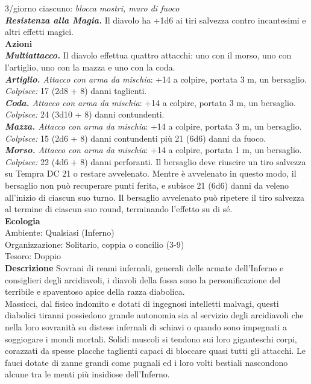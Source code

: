 \begin{multicols}{2}
3/giorno ciascuno: \emph{blocca mostri, muro di fuoco}\\
\emph{\textbf{Resistenza alla Magia.}} Il diavolo ha +1d6 ai tiri salvezza contro incantesimi e altri effetti magici.\\
\smallskip\textbf{Azioni}\\
\emph{\textbf{Multiattacco.}} Il diavolo effettua quattro attacchi: uno con il morso, uno con l'artiglio, uno con la mazza e uno con la coda.\\
\emph{\textbf{Artiglio.} Attacco con arma da mischia}: +14 a colpire, portata 3 m, un bersaglio.\\
\emph{Colpisce:} 17 (2d8 + 8) danni taglienti.\\
\emph{\textbf{Coda.} Attacco con arma da mischia}: +14 a colpire, portata 3 m, un bersaglio.\\
\emph{Colpisce:} 24 (3d10 + 8) danni contundenti.\\
\emph{\textbf{Mazza.} Attacco con arma da mischia}: +14 a colpire, portata 3 m, un bersaglio.\\
\emph{Colpisce:} 15 (2d6 + 8) danni contundenti più 21 (6d6) danni da fuoco.\\
\emph{\textbf{Morso.} Attacco con arma da mischia}: +14 a colpire, portata 1 m, un bersaglio.\\
\emph{Colpisce:} 22 (4d6 + 8) danni perforanti. Il bersaglio deve riuscire un tiro salvezza su Tempra DC 21 o restare avvelenato. Mentre è avvelenato in questo modo, il bersaglio non può recuperare punti ferita, e subisce 21 (6d6) danni da veleno all'inizio di ciascun suo turno. Il bersaglio avvelenato può ripetere il tiro salvezza al termine di ciascun suo round, terminando l'effetto su di sé. \\
\textbf{Ecologia}\\
Ambiente: Qualsiasi (Inferno)\\
Organizzazione: Solitario, coppia o concilio (3-9)\\
Tesoro: Doppio\\
\textbf{Descrizione}
Sovrani di reami infernali, generali delle armate dell’Inferno e consiglieri degli arcidiavoli, i diavoli della fossa sono la personificazione del terribile e spaventoso apice della razza diabolica.\\
Massicci, dal fisico indomito e dotati di ingegnosi intelletti malvagi, questi diabolici tiranni possiedono grande autonomia sia al servizio degli arcidiavoli che nella loro sovranità su distese infernali di schiavi o quando sono impegnati a soggiogare i mondi mortali. Solidi muscoli si tendono sui loro giganteschi corpi, corazzati da spesse placche taglienti capaci di bloccare quasi tutti gli attacchi. Le fauci dotate di zanne grandi come pugnali ed i loro volti bestiali nascondono alcune tra le menti più insidiose dell’Inferno.\\

\end{multicols}
